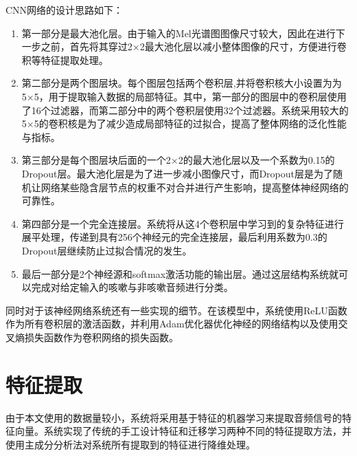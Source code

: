 CNN网络的设计思路如下：
\begin{enumerate}
    \item 第一部分是最大池化层。由于输入的Mel光谱图图像尺寸较大，因此在进行下一步之前，首先将其穿过2×2最大池化层以减小整体图像的尺寸，方便进行卷积等特征提取处理。
    \item 第二部分是两个图层块。每个图层包括两个卷积层,并将卷积核大小设置为为5×5，用于提取输入数据的局部特征。其中，第一部分的图层中的卷积层使用了16个过滤器，而第二部分中的两个卷积层使用32个过滤器。系统采用较大的5×5的卷积核是为了减少造成局部特征的过拟合，提高了整体网络的泛化性能与指标。
    \item 第三部分是每个图层块后面的一个2×2的最大池化层以及一个系数为0.15的Dropout层。最大池化层是为了进一步减小图像尺寸，而Dropout层是为了随机让网络某些隐含层节点的权重不对合并进行产生影响，提高整体神经网络的可靠性。
    \item 第四部分是一个完全连接层。系统将从这4个卷积层中学习到的复杂特征进行展平处理，传递到具有256个神经元的完全连接层，最后利用系数为0.3的Dropout层继续防止过拟合情况的发生。
    \item 最后一部分是2个神经源和softmax激活功能的输出层。通过这层结构系统就可以完成对给定输入的咳嗽与非咳嗽音频进行分类。
\end{enumerate}

同时对于该神经网络系统还有一些实现的细节。在该模型中，系统使用ReLU函数作为所有卷积层的激活函数，并利用Adam优化器优化神经的网络结构\cite{kingman2015adam}以及使用交叉熵损失函数作为卷积网络的损失函数。

\section{特征提取}
由于本文使用的数据量较小，系统将采用基于特征的机器学习来提取音频信号的特征向量。系统实现了传统的手工设计特征和迁移学习两种不同的特征提取方法，并使用主成分分析法对系统所有提取到的特征进行降维处理。

